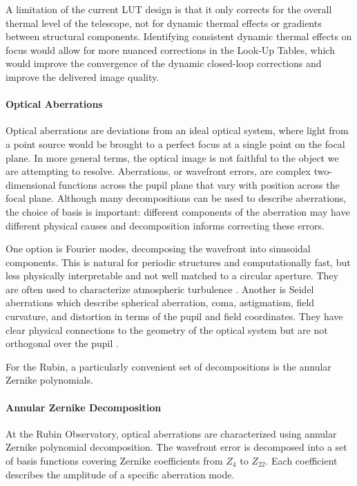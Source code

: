 \documentclass[SE,authoryear,toc]{lsstdoc}
\begin{document}
A limitation of the current LUT design is that it only corrects for the overall thermal level of the telescope, not for dynamic thermal effects or gradients between structural components. Identifying consistent dynamic thermal effects on focus would allow for more nuanced corrections in the Look-Up Tables, which would improve the convergence of the dynamic closed-loop corrections and improve the delivered image quality. 

\paragraph{Optical Aberrations}
Optical aberrations are deviations from an ideal optical system, where light from a point source would be brought to a perfect focus at a single point on the focal plane. In more general terms, the optical image is not faithful to the object we are attempting to resolve. Aberrations, or wavefront errors, are complex two-dimensional functions across the pupil plane that vary with position across the focal plane. Although many decompositions can be used to describe aberrations, the choice of basis is important: different components of the aberration may have different physical causes and decomposition informs correcting these errors.

One option is Fourier modes, decomposing the wavefront into sinusoidal components. This is natural for periodic structures and computationally fast, but less physically interpretable and not well matched to a circular aperture. They are often used to characterize atmospheric turbulence \citep{poyneer2003}. Another is Seidel aberrations which describe spherical aberration, coma, astigmatism, field curvature, and distortion in terms of the pupil and field coordinates. They have clear physical connections to the geometry of the optical system but are not orthogonal over the pupil \citep{welford1986}.

For the Rubin, a particularly convenient set of decompositions is the annular Zernike polynomials. 

\paragraph{Annular Zernike Decomposition}
\label{subsec: zernike decomp}
At the Rubin Observatory, optical aberrations are characterized using annular Zernike polynomial decomposition. The wavefront error is decomposed into a set of basis functions covering Zernike coefficients from $Z_4$ to $Z_{22}$. Each coefficient describes the amplitude of a specific aberration mode. 
\end{document}
